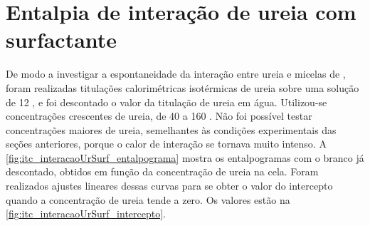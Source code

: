 

%
\FloatBarrier
\section{Entalpia de interação de ureia com surfactante} 

	De modo a investigar a espontaneidade da interação entre ureia e micelas de \TTAB{}, foram realizadas titulações calorimétricas isotérmicas de ureia sobre uma solução de \TTAB{} 12 \mM, e foi descontado o valor da titulação de ureia em água. Utilizou-se concentrações crescentes de ureia, de 40 a 160 \mM. Não foi possível testar concentrações maiores de ureia, semelhantes às condições experimentais das seções anteriores, porque o calor de interação se tornava muito intenso. A \autoref{fig:itc_interacaoUrSurf_entalpograma} mostra os entalpogramas com o branco já descontado, obtidos em função da concentração de ureia na cela. Foram realizados ajustes lineares  dessas curvas para se obter o valor do intercepto quando a concentração de ureia tende a zero. Os valores estão na \autoref{fig:itc_interacaoUrSurf_intercepto}.
	

